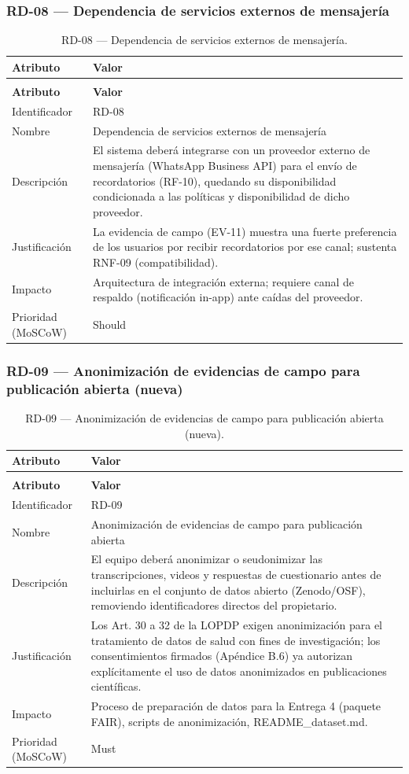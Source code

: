 \documentclass[journal,onecolumn]{IEEEtran}
\makeatletter
\newenvironment{atributos}[2]{%
	\small
	\begin{longtable}{@{}>{\raggedright\arraybackslash}p{4.2cm} >{\raggedright\arraybackslash}p{11.2cm}@{}}
		\caption{#2}\label{tab:#1}\\
		\toprule
		\textbf{Atributo} & \textbf{Valor} \\
		\midrule
		\endfirsthead
		\multicolumn{2}{@{}l}{\small\itshape (continuación)}\\
		\toprule
		\textbf{Atributo} & \textbf{Valor} \\
		\midrule
		\endhead
		\bottomrule
		\endlastfoot
	}{%
	\end{longtable}
	\normalsize
}
\makeatother
\begin{document}
	\subsubsection{RD-08 --- Dependencia de servicios externos de mensajería}
	
	\begin{atributos}{RD-08}{RD-08 --- Dependencia de servicios externos de mensajería.}
		Identificador & RD-08 \\
		Nombre & Dependencia de servicios externos de mensajería \\
		Descripción & El sistema deberá integrarse con un proveedor externo de mensajería (WhatsApp Business API) para el envío de recordatorios (RF-10), quedando su disponibilidad condicionada a las políticas y disponibilidad de dicho proveedor. \\
		Justificación & La evidencia de campo (EV-11) muestra una fuerte preferencia de los usuarios por recibir recordatorios por ese canal; sustenta RNF-09 (compatibilidad). \\
		Impacto & Arquitectura de integración externa; requiere canal de respaldo (notificación in-app) ante caídas del proveedor. \\
		Prioridad (MoSCoW) & Should \\
	\end{atributos}
	
	\subsubsection{RD-09 --- Anonimización de evidencias de campo para publicación abierta (nueva)}
	
	\begin{atributos}{RD-09}{RD-09 --- Anonimización de evidencias de campo para publicación abierta (nueva).}
		Identificador & RD-09 \\
		Nombre & Anonimización de evidencias de campo para publicación abierta \\
		Descripción & El equipo deberá anonimizar o seudonimizar las transcripciones, videos y respuestas de cuestionario antes de incluirlas en el conjunto de datos abierto (Zenodo/OSF), removiendo identificadores directos del propietario. \\
		Justificación & Los Art. 30 a 32 de la LOPDP exigen anonimización para el tratamiento de datos de salud con fines de investigación; los consentimientos firmados (Apéndice B.6) ya autorizan explícitamente el uso de datos anonimizados en publicaciones científicas. \\
		Impacto & Proceso de preparación de datos para la Entrega 4 (paquete FAIR), scripts de anonimización, README\_dataset.md. \\
		Prioridad (MoSCoW) & Must \\
	\end{atributos}
	
\end{document}
